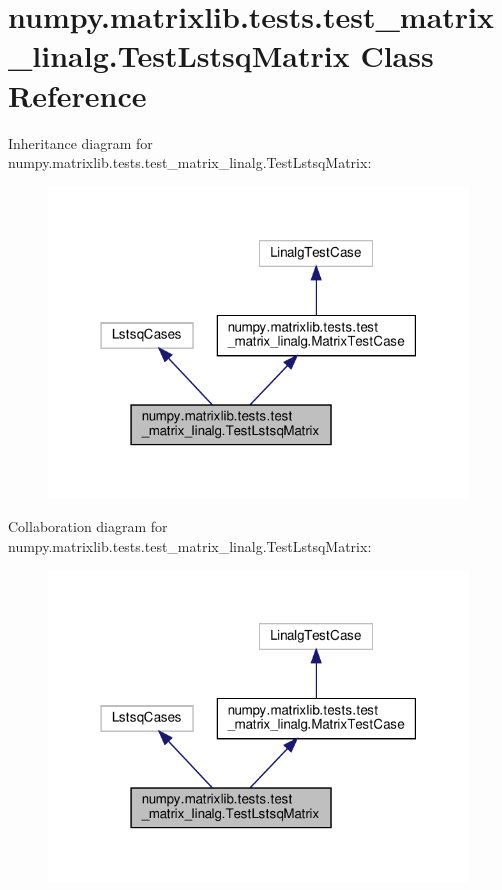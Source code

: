 \hypertarget{classnumpy_1_1matrixlib_1_1tests_1_1test__matrix__linalg_1_1TestLstsqMatrix}{}\section{numpy.\+matrixlib.\+tests.\+test\+\_\+matrix\+\_\+linalg.\+Test\+Lstsq\+Matrix Class Reference}
\label{classnumpy_1_1matrixlib_1_1tests_1_1test__matrix__linalg_1_1TestLstsqMatrix}


Inheritance diagram for numpy.\+matrixlib.\+tests.\+test\+\_\+matrix\+\_\+linalg.\+Test\+Lstsq\+Matrix\+:
\nopagebreak
\begin{figure}[H]
\begin{center}
\leavevmode
\includegraphics[width=316pt]{classnumpy_1_1matrixlib_1_1tests_1_1test__matrix__linalg_1_1TestLstsqMatrix__inherit__graph}
\end{center}
\end{figure}


Collaboration diagram for numpy.\+matrixlib.\+tests.\+test\+\_\+matrix\+\_\+linalg.\+Test\+Lstsq\+Matrix\+:
\nopagebreak
\begin{figure}[H]
\begin{center}
\leavevmode
\includegraphics[width=316pt]{classnumpy_1_1matrixlib_1_1tests_1_1test__matrix__linalg_1_1TestLstsqMatrix__coll__graph}
\end{center}
\end{figure}
